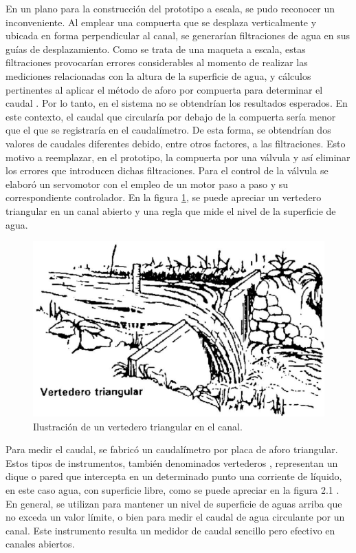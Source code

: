 En un plano para la construcción del prototipo a escala, se pudo reconocer un inconveniente. Al emplear una compuerta que se desplaza verticalmente y ubicada en forma perpendicular al canal, se generarían filtraciones de agua en sus guías de desplazamiento. Como se trata de una maqueta a escala, estas filtraciones provocarían errores considerables al momento de realizar las mediciones relacionadas con la altura de la superficie de agua, y cálculos pertinentes al aplicar el método de aforo por compuerta para determinar el caudal \citep{AFOROPORCOMPUERTA}. Por lo tanto, en el sistema no se obtendrían los resultados esperados. En este contexto, el caudal que circularía por debajo de la compuerta sería menor que el que se registraría en el caudalímetro. De esta forma, se obtendrían dos valores de caudales diferentes debido, entre otros factores, a las filtraciones.     
Esto motivo a reemplazar, en el prototipo, la compuerta por una válvula y así eliminar los errores que introducen dichas filtraciones. 
Para el control de la válvula se elaboró un servomotor con el empleo de un motor paso a paso y su correspondiente controlador.
En la figura \ref{fig:Vertedero triangular}, se puede apreciar un vertedero triangular en un canal abierto y una regla que mide el nivel de la superficie de agua.
\begin{figure}[h]
\centering
\includegraphics[scale=.57]{./Figures/VertederoTriangular.png}
\caption{Ilustración de un vertedero triangular en el canal\protect\footnotemark.}
\label{fig:Vertedero triangular}
\end{figure}

Para medir el caudal, se fabricó un caudalímetro por placa de aforo triangular. Estos tipos de instrumentos, también denominados vertederos \citep{VERTEDEROS}, representan un dique o pared que intercepta en un determinado punto una corriente de líquido, en este caso agua, con superficie libre, como se puede apreciar en la figura 2.1 . En general, se utilizan para mantener un nivel de superficie de aguas arriba que no exceda un valor límite, o bien para medir el caudal de agua circulante por un canal. Este instrumento resulta un medidor de caudal sencillo pero efectivo en canales abiertos. 

